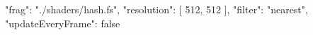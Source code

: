 {
  "frag": "./shaders/hash.fs",
  "resolution": [
    512,
    512
  ],
  "filter": "nearest",
  "updateEveryFrame": false
}
